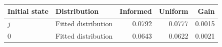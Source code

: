 \begin{tabular}{llrrr}\toprule
Initial state & Distribution & Informed & Uniform & Gain\\\midrule
$j$ & Fitted distribution & 0.0792 & 0.0777 & 0.0015 \\
$0$ & Fitted distribution & 0.0643 & 0.0622 & 0.0021 \\
\bottomrule\end{tabular}
